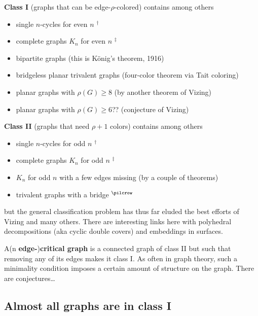 \documentclass[12pt]{article}
\let\uml\"              %
\let\ge\geqslant
\begin{document}
{\bf Class I} (graphs that can be edge-$\rho$-colored) contains among others
%
\begin{itemize}

\item single $n$-cycles for even $n$ $^\dagger$

\item complete graphs $K_n$ for even $n$ $^\ddagger$

\item bipartite graphs (this is K\uml{o}nig's theorem, 1916)

\item bridgeless planar trivalent graphs (four-color theorem via Tait coloring)

\item planar graphs with $\rho(G)\ge8$ (by another theorem of Vizing)

\item planar graphs with $\rho(G)\ge6$?? (conjecture of Vizing)

\end{itemize}
%
{\bf Class II} (graphs that need $\rho+1$ colors) contains among others
%
\begin{itemize}

\item single $n$-cycles for odd $n$ $^\dagger$

\item complete graphs $K_n$ for odd $n$ $^\ddagger$

\item $K_n$ for odd $n$ with a few edges missing (by a couple of theorems)

\item trivalent graphs with a bridge $^\pilcrow$

\end{itemize}
%
but the general classification problem has thus far eluded the best efforts of
Vizing and many others. There are interesting links here with polyhedral
decompositions (aka cyclic double covers) and embeddings in surfaces.

A(n {\bf edge-}){\bf critical graph} is a connected graph of class II but such
that removing any of its edges makes it class I. As often in graph theory,
such a minimality condition imposes a certain amount of structure on the graph.
There are conjectures\dots

\subsection*{Almost all graphs are in class I}
\end{document}

